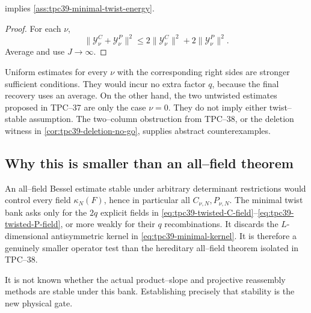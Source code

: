 \begin{proposition}
\label{prop:tpc39-face-stability-implies-minimal}
 implies
\cref{ass:tpc39-minimal-twist-energy}.
\end{proposition}

\begin{proof}
For each \(\nu\),
\[
 \|\mathscr Y_\nu^C+\mathscr Y_\nu^P\|^2
 \le2\|\mathscr Y_\nu^C\|^2+2\|\mathscr Y_\nu^P\|^2.
\]
Average and use \(J\to\infty\).
\end{proof}

Uniform estimates for every \(\nu\) with the corresponding right sides
are stronger sufficient conditions.  They would incur no extra factor
\(q\), because the final recovery uses an average.  On the other hand,
the two untwisted estimates proposed in TPC--37 are only the case
\(\nu=0\).  They do not imply either twist--stable assumption.  The
two--column obstruction from TPC--38, or the deletion witness in
\cref{cor:tpc39-deletion-no-go}, supplies abstract counterexamples.

\subsection{Why this is smaller than an all--field theorem}

An all--field Bessel estimate stable under arbitrary determinant
restrictions would control every field
\(\kappa_N(F)\), hence in particular all
\(C_{\nu,N},P_{\nu,N}\).  The minimal twist bank asks only for the
\(2q\) explicit fields in
\eqref{eq:tpc39-twisted-C-field}--\eqref{eq:tpc39-twisted-P-field}, or
more weakly for their \(q\) recombinations.  It discards the
\(L\)-dimensional antisymmetric kernel in
\eqref{eq:tpc39-minimal-kernel}.  It is therefore a genuinely smaller
operator test than the hereditary all--field theorem isolated in TPC--38.

It is not known whether the actual product--slope and projective
reassembly methods are stable under this bank.  Establishing precisely
that stability is the new physical gate.
